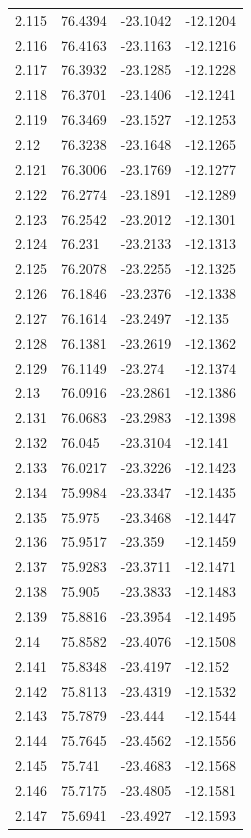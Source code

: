 \begin{tabular}{llll}
2.115 & 76.4394 & -23.1042 & -12.1204 \\
2.116 & 76.4163 & -23.1163 & -12.1216 \\
2.117 & 76.3932 & -23.1285 & -12.1228 \\
2.118 & 76.3701 & -23.1406 & -12.1241 \\
2.119 & 76.3469 & -23.1527 & -12.1253 \\
2.12 & 76.3238 & -23.1648 & -12.1265 \\
2.121 & 76.3006 & -23.1769 & -12.1277 \\
2.122 & 76.2774 & -23.1891 & -12.1289 \\
2.123 & 76.2542 & -23.2012 & -12.1301 \\
2.124 & 76.231 & -23.2133 & -12.1313 \\
2.125 & 76.2078 & -23.2255 & -12.1325 \\
2.126 & 76.1846 & -23.2376 & -12.1338 \\
2.127 & 76.1614 & -23.2497 & -12.135 \\
2.128 & 76.1381 & -23.2619 & -12.1362 \\
2.129 & 76.1149 & -23.274 & -12.1374 \\
2.13 & 76.0916 & -23.2861 & -12.1386 \\
2.131 & 76.0683 & -23.2983 & -12.1398 \\
2.132 & 76.045 & -23.3104 & -12.141 \\
2.133 & 76.0217 & -23.3226 & -12.1423 \\
2.134 & 75.9984 & -23.3347 & -12.1435 \\
2.135 & 75.975 & -23.3468 & -12.1447 \\
2.136 & 75.9517 & -23.359 & -12.1459 \\
2.137 & 75.9283 & -23.3711 & -12.1471 \\
2.138 & 75.905 & -23.3833 & -12.1483 \\
2.139 & 75.8816 & -23.3954 & -12.1495 \\
2.14 & 75.8582 & -23.4076 & -12.1508 \\
2.141 & 75.8348 & -23.4197 & -12.152 \\
2.142 & 75.8113 & -23.4319 & -12.1532 \\
2.143 & 75.7879 & -23.444 & -12.1544 \\
2.144 & 75.7645 & -23.4562 & -12.1556 \\
2.145 & 75.741 & -23.4683 & -12.1568 \\
2.146 & 75.7175 & -23.4805 & -12.1581 \\
2.147 & 75.6941 & -23.4927 & -12.1593 \\

\end{tabular}
